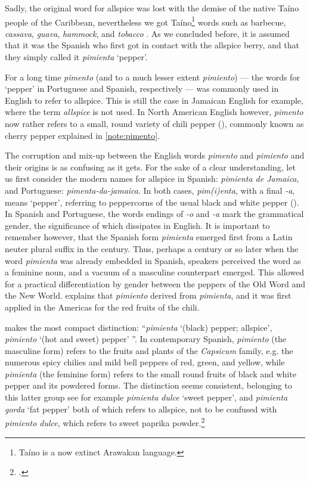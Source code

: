 Sadly, the original word for allspice was lost with the demise of the native Taíno people of the Caribbean, nevertheless we got Taíno\footnote{Taíno is a now extinct Arawakan language.} words such as barbecue, \textit{cassava}, \textit{guava}, \textit{hammock}, and \textit{tobacco} \autocite[229]{rafinesque_american_1836}. As we concluded before, it is assumed that it was the Spanish who first got in contact with the allspice berry, and that they simply called it \textit{pimienta} `pepper'.



For a long time  \textit{pimento} (and to a much lesser extent \textit{pimiento}) --- the words for `pepper' in Portuguese and Spanish, respectively --- was commonly used in English to refer to allspice. This is still the case in Jamaican English for example, where the term \textit{allspice} is not used. In North American English however, \textit{pimento} now rather refers to a small, round variety of chili pepper (), commonly known as cherry pepper explained in \cref{note:pimento}. 

The corruption and mix-up between the English words \textit{pimento} and \textit{pimiento} and their origins is as confusing as it gets. For the sake of a clear understanding, let us first consider the modern names for allspice in Spanish: \textit{pimienta de Jamaica}, and Portuguese: \textit{pimenta-da-jamaica}. In both cases, \textit{pim\-(i)enta}, with a final \textit{-a}, means `pepper', referring to peppercorns of the usual black and white pepper (). In Spanish and Portuguese, the words endings of \textit{-o} and \textit{-a} mark the grammatical gender, the significance of which dissipates in English. It is important to remember however, that the Spanish form \textit{pimienta} emerged first from a Latin neuter plural suffix in the  century. Thus, perhaps a century or so later when the word \textit{pimienta} was already embedded in Spanish, speakers perceived the word as a feminine noun, and a vacuum of a masculine counterpart emerged. This allowed for a practical differentiation by gender between the peppers of the Old Word and the New World. \textcite[459]{corominas_breve_1987} explains that \textit{pimiento} derived from \textit{pimienta}, and it was first applied in the Americas for the red fruits of the chili.

\textcite[415]{gomez_de_silva_elseviers_1985} makes the most compact distinction: ``\textit{pimienta} `(black) pepper; allspice', \textit{pimiento} `(hot and sweet) pepper' ''. In contemporary Spanish, \textit{pimiento} (the masculine form) refers to the fruits and plants of the \textit{Capsicum} family, e.g. the numerous spicy chilies and mild bell peppers of red, green, and yellow, while \textit{pimienta} (the feminine form) refers to the small round fruits of black and white pepper and its powdered forms. The distinction seems consistent, belonging to this latter group see for example \textit{pimienta dulce} `sweet pepper', and \textit{pimienta gorda} `fat pepper' both of which refers to allspice, not to be confused with \textit{pimiento dulce}, which refers to sweet paprika powder.\footcite[pimiento, -a]{dle}

